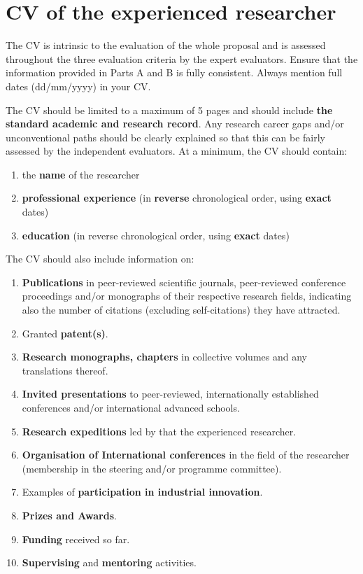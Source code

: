 
\newpage
\section{CV of the experienced researcher}
\label{sec:cv}

The CV is intrinsic to the evaluation of the whole proposal and is assessed throughout the
three evaluation criteria by the expert evaluators. Ensure that the information provided in
Parts A and B is fully consistent. Always mention full dates (dd/mm/yyyy) in your CV.

\medskip\noindent
The CV should be limited to a maximum of 5 pages and should include \textbf{the standard
academic and research record}. Any research career gaps and/or unconventional paths
should be clearly explained so that this can be fairly assessed by the independent
evaluators. At a minimum, the CV should contain:

\begin{enumerate}[label=\alph*)]
\item the \textbf{name} of the researcher
\item \textbf{professional experience} (in \textbf{reverse} chronological order, using \textbf{exact} dates)
\item \textbf{education} (in reverse chronological order, using \textbf{exact} dates)
\end{enumerate}

\medskip\noindent
The CV should also include information on:

\begin{enumerate}
\item \textbf{Publications} in peer-reviewed scientific journals, peer-reviewed conference proceedings and/or monographs of their respective research fields, indicating also the number of citations (excluding self-citations) they have attracted.
\item Granted \textbf{patent(s)}.
\item \textbf{Research monographs, chapters} in collective volumes and any translations thereof.
\item \textbf{Invited presentations} to peer-reviewed, internationally established conferences and/or international advanced schools.
\item \textbf{Research expeditions} led by that the experienced researcher. 
\item \textbf{Organisation of International conferences} in the field of the researcher (membership in the steering and/or programme committee).
\item Examples of \textbf{participation in industrial innovation}.
\item \textbf{Prizes and Awards}.
\item \textbf{Funding} received so far.
\item \textbf{Supervising} and \textbf{mentoring} activities.
\end{enumerate}




